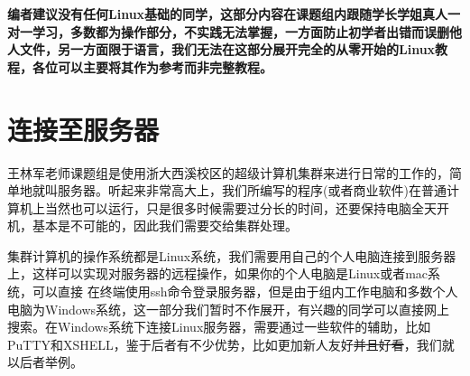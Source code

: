 \documentclass[12pt,a4paper,openany,twoside]{book}
\numberwithin{equation}{section}
\begin{document}
      {\color{red}\textbf{编者建议没有任何Linux基础的同学，这部分内容在课题组内跟随学长学姐真人一对一学习，多数都为操作部分，不实践无法掌握，一方面防止初学者出错而误删他人文件，另一方面限于语言，我们无法在这部分展开完全的从零开始的Linux教程，各位可以主要将其作为参考而非完整教程。}}

      \section{连接至服务器}
        王林军老师课题组是使用浙大西溪校区的超级计算机集群来进行日常的工作的，简单地就叫服务器。听起来非常高大上，我们所编写的程序(或者商业软件)在普通计算机上当然也可以运行，只是很多时候需要过分长的时间，还要保持电脑全天开机，基本是不可能的，因此我们需要交给集群处理。

        集群计算机的操作系统都是Linux系统，我们需要用自己的个人电脑连接到服务器上，这样可以实现对服务器的远程操作，如果你的个人电脑是Linux或者mac系统，可以直接
        在终端使用ssh命令登录服务器，但是由于组内工作电脑和多数个人电脑为Windows系统，这一部分我们暂时不作展开，有兴趣的同学可以直接网上搜索。在Windows系统下连接Linux服务器，需要通过一些软件的辅助，比如PuTTY和XSHELL，鉴于后者有不少优势，比如更加新人友好\sout{并且好看}，我们就以后者举例。
\end{document}
